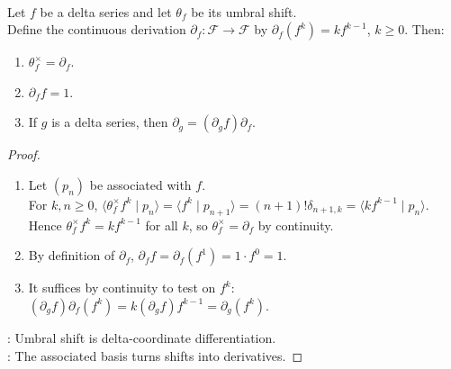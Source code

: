 \begin{theorem} \label{thm:umbral-shift-derivation-chain-rule} \\
Let $f$ be a delta series and let $\theta_f$ be its umbral shift.\\
Define the continuous derivation $\partial_f:\mathscr{F}\to\mathscr{F}$ by $\partial_f(f^k)=kf^{k-1}$, $k\geq0$. Then:
\begin{enumerate}[label=(\roman*)]
\setlength{\itemsep}{0pt}
\item $\theta_f^\times=\partial_f$.
\item $\partial_f f=1$.
\item If $g$ is a delta series, then $\partial_g=(\partial_g f)\partial_f$.
\end{enumerate}
\begin{proof}
\begin{enumerate}[label=(\roman*)]
\setlength{\itemsep}{0pt}
\item Let $(p_n)$ be associated with $f$.\\
For $k,n\geq0$, $\langle \theta_f^\times f^k\mid p_n\rangle =\langle f^k\mid p_{n+1}\rangle =(n+1)!\delta_{n+1,k} =\langle kf^{k-1}\mid p_n\rangle$.\\
Hence $\theta_f^\times f^k=kf^{k-1}$ for all $k$, so $\theta_f^\times=\partial_f$ by continuity.
\item By definition of $\partial_f$, $\partial_f f=\partial_f(f^1)=1\cdot f^0=1$.
\item It suffices by continuity to test on $f^k$: $(\partial_g f)\partial_f(f^k)=k(\partial_g f)f^{k-1}=\partial_g(f^k)$.
\end{enumerate}
: Umbral shift is delta-coordinate differentiation.\\
: The associated basis turns shifts into derivatives.
\end{proof}
\end{theorem}

